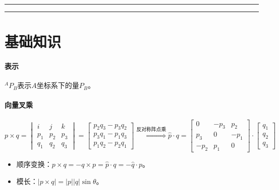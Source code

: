 \documentclass[
12pt, %
a4paper, 
oneside, %
headinclude,footinclude, %
]{scrartcl}
\title{\normalfont\spacedallcaps{机器人学导论}}
\date{}
\begin{document}
\maketitle
\newpage
\hypertarget{toc}{}
\begingroup
\begin{multicols}{2}
\tableofcontents
\end{multicols}
\endgroup
\hrule
\begingroup
\begin{multicols}{2}
\listoffigures
\end{multicols}
\endgroup
\hrule
\begingroup
\begin{multicols}{2}
\listoftables
\end{multicols}
\endgroup
\newpage
\listoftips
\newpage
\section{基础知识}
\paragraph{表示}
$ {}^A P_B $表示$ A $坐标系下的量$ P_B $。
\paragraph{向量叉乘}
$$
p \times q = \begin{vmatrix} i & j & k \\ p_1 & p_2 & p_3 \\ q_1 & q_2 & q_3 \end{vmatrix} = \begin{bmatrix} p_2 q_3 - p_3 q_2 \\ p_3 q_1 - p_1 q_3 \\ p_1 q_2 - p_2 q_1 \end{bmatrix}
\overset{\text{反对称阵点乘}}{\Longrightarrow}
\hat{p} \cdot q = \begin{bmatrix} 0 & -p_3 & p_2 \\ p_3 & 0 & -p_1 \\ -p_2 & p_1 & 0 \end{bmatrix} \cdot \begin{bmatrix} q_1 \\ q_2 \\ q_3 \end{bmatrix}
$$

\begin{itemize}
\item 顺序变换：$ p \times q = -q \times p = \hat{p} \cdot q = -\hat{q} \cdot p $。
\item 模长：$ |p \times q| = |p||q|\sin\theta $。
\end{itemize}
\end{document}
